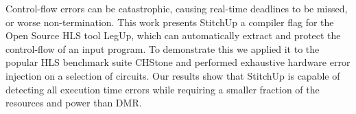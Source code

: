 Control-flow errors can be catastrophic, causing real-time deadlines to be missed, or worse non-termination.
This work presents StitchUp a compiler flag for the Open Source HLS tool LegUp, which can automatically extract and protect the control-flow of an input program.
To demonstrate this we applied it to the popular HLS benchmark suite CHStone and performed exhaustive hardware error injection on a selection of circuits.
Our results show that StitchUp is capable of detecting all execution time errors while requiring a smaller fraction of the resources and power than DMR.

